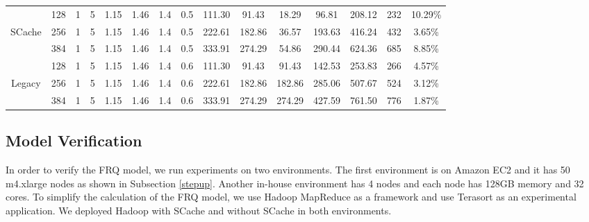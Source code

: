 {\begin{table}[!t]
\begin{tabular}{|c||c|c|c|c|c|c|c||c|c|c|c|c|c|c|}
\hline
& 128	& 1 & 5 &	1.15 &	1.46	&	1.4 &	0.5 &	111.30 &	91.43	&	18.29	&	96.81	&	208.12	&	232	&	10.29\%	\\
SCache
& 256	& 1 & 5 &	1.15 &	1.46	&	1.4 &	0.5 &	222.61 &	182.86	&	36.57	&	193.63	&	416.24	&	432	&	3.65\%	\\
& 384	& 1 & 5 &	1.15 &	1.46	&	1.4 &	0.5 &	333.91 &	274.29	&	54.86	&	290.44	&	624.36	&	685 &	8.85\%	\\
\hline
& 128	& 1 & 5 &	1.15 &	1.46	&	1.4 &	0.6 &	111.30 &	91.43	&	91.43	&	142.53	&	253.83	&	266 &	4.57\%	\\
Legacy
& 256	& 1 & 5 &	1.15 &	1.46	&	1.4 &	0.6 &	222.61 &	182.86	&	182.86	&	285.06	&	507.67	&	524 &	3.12\%	\\
& 384	& 1 & 5 &	1.15 &	1.46	&	1.4 &	0.6 &	333.91 &	274.29	&	274.29	&	427.59	&	761.50	&	776 &	1.87\%	\\

\hline
\end{tabular}
\end{table}

\subsection{Model Verification}\label{model_verification}
In order to verify the FRQ model, we run experiments on two environments. The first environment is on Amazon EC2 and it has 50 m4.xlarge nodes as shown in Subsection \ref{stepup}. Another in-house environment has 4 nodes and each node has 128GB memory and 32 cores. To simplify the calculation of the FRQ model, we use Hadoop MapReduce as a framework and use Terasort as an experimental application. We deployed Hadoop with SCache and without SCache in both environments.

}
